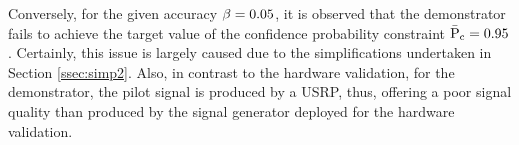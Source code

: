 %
%		
%

Conversely, for the given accuracy $\beta = 0.05$, it is observed that the demonstrator fails to achieve the target value of the confidence probability constraint $\bar{\text{P}}_{\text{c}} = 0.95$. Certainly, this issue is largely caused due to the simplifications undertaken in Section \ref{ssec:simp2}. 
Also, in contrast to the hardware validation, for the demonstrator, the pilot signal is produced by a USRP, thus, offering a poor signal quality than produced by the signal generator deployed for the hardware validation. 

